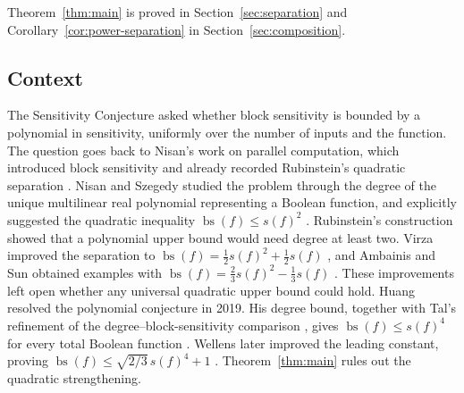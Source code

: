 \documentclass[11pt]{article}
\newcommand{\bs}{\operatorname{bs}}
\theoremstyle{definition}
\theoremstyle{remark}
\begin{document}
Theorem~\ref{thm:main} is proved in Section~\ref{sec:separation} and Corollary~\ref{cor:power-separation} in Section~\ref{sec:composition}.

\subsection{Context}

The Sensitivity Conjecture asked whether block sensitivity is bounded by a
polynomial in sensitivity, uniformly over the number of inputs and the
function. The question goes back to Nisan's work on parallel computation,
which introduced block sensitivity and already recorded Rubinstein's
quadratic separation \cite[Section~2]{Nisan1989}.
Nisan and Szegedy studied the problem through the degree of the unique
multilinear real polynomial representing a Boolean function, and explicitly
suggested the quadratic inequality \(\bs(f)\le s(f)^2\)
\cite[Section~4]{NisanSzegedy1994}.
Rubinstein's construction \cite{Rubinstein1995} showed that a polynomial
upper bound would need degree at least two. Virza improved the separation
to \(\bs(f)=\tfrac12s(f)^2+\tfrac12s(f)\) \cite{Virza2011}, and
Ambainis and Sun obtained examples with
\(\bs(f)=\frac23s(f)^2-\frac13s(f)\)
\cite[Theorem~1]{AmbainisSun2011}.
These improvements left open whether any universal quadratic upper bound
could hold.
Huang resolved the polynomial conjecture in 2019. His degree bound,
together with Tal's refinement of the degree--block-sensitivity comparison
\cite{Tal2013}, gives \(\bs(f)\le s(f)^4\) for every total Boolean function
\cite[Theorem~1.5]{Huang2019}. Wellens later improved the leading constant,
proving \(\bs(f)\le\sqrt{2/3}\,s(f)^4+1\)
\cite[Corollary~4.2]{Wellens2022}.
Theorem~\ref{thm:main} rules out the quadratic strengthening.
\end{document}
